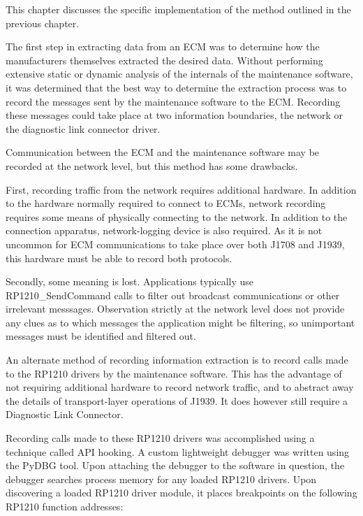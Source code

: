 
This chapter discusses the specific implementation of the method outlined in the previous chapter.


The first step in extracting data from an ECM was to determine how the manufacturers themselves extracted
the desired data. Without performing extensive static or dynamic analysis of the internals of the maintenance
software, it was determined that the best way to determine the extraction process was to record the messages
sent by the maintenance software to the ECM. Recording these messages could take place at two information boundaries,
the network or the diagnostic link connector driver.


Communication between the ECM and the maintenance software may be recorded at the network level, but this method
has some drawbacks.

First, recording traffic from the network requires additional hardware. In addition to the hardware normally required
to connect to ECMs, network recording requires some means of physically connecting to the network. In addition to the 
connection apparatus, network-logging device is also required. As it is not uncommon for ECM communications to take place over both J1708 and J1939, 
this hardware must be able to record both protocols.

Secondly, some meaning is lost. Applications typically use RP1210\_SendCommand calls to filter out broadcast communications
or other irrelevant messsages. Observation strictly at the network level does not provide any clues as to which messages
the application might be filtering, so unimportant messages must be identified and filtered out.


An alternate method of recording information extraction is to record calls made to the RP1210 drivers
by the maintenance software. This has the advantage of not requiring additional hardware to 
record network traffic, and to abstract away the details of transport-layer operations of J1939. It does however
still require a Diagnostic Link Connector.

Recording calls made to these RP1210 drivers was accomplished using a technique called API hooking\cite{Berdajs2010}.
A custom lightweight debugger was written using the PyDBG tool\cite{Amini2012}. Upon attaching the debugger to the software
in question, the debugger searches process memory for any loaded RP1210 drivers. Upon discovering a loaded RP1210
driver module, it places breakpoints on the following RP1210 function addresses:

